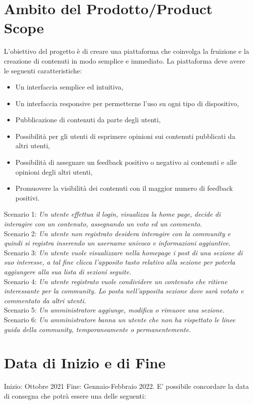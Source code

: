 \documentclass[12pt]{article}
\begin{document}
  \section{Ambito del Prodotto/Product Scope}
  L'obiettivo del progetto è di creare una piattaforma che coinvolga la fruizione e la creazione di contenuti in modo semplice e immediato. La piattaforma deve avere le seguenti caratteristiche:
  \begin{itemize}
  \item Un interfaccia semplice ed intuitiva,
  \item Un interfaccia responsive per permetterne l’uso su ogni tipo di dispositivo,
  \item Pubblicazione di contenuti da parte degli utenti,
  \item Possibilità per gli utenti di esprimere opinioni sui contenuti pubblicati da altri utenti,
  \item Possibilità di assegnare un feedback positivo o negativo ai contenuti e alle opinioni degli altri utenti,
  \item Promuovere la visibilità dei contenuti con il maggior numero di feedback positivi.
  
  \end{itemize}
  Scenario 1:
  \emph{Un utente effettua il login, visualizza la home page, decide di interagire con un contenuto, assegnando un voto ed un commento.}
\\
  Scenario 2:
  \emph{Un utente non registrato desidera interagire con la community e quindi si registra inserendo un username univoco e informazioni aggiuntive.}
\\
  Scenario 3:
  \emph{Un utente vuole visualizzare nella homepage i post di una sezione di suo interesse, a tal fine clicca l'apposito tasto relativo alla sezione per poterla aggiungere alla sua lista di sezioni seguite.}
\\
  Scenario 4:
  \emph{Un utente registrato vuole condividere un contenuto che ritiene interessante per la community. Lo posta nell'apposita sezione dove sarà votato e commentato da altri utenti.}
\\
  Scenario 5:
  \emph{Un amministratore aggiunge, modifica o rimuove una sezione.}
\\
  Scenario 6:
  \emph{Un amministratore banna un utente che non ha rispettato le linee guida della community, temporaneamente o permanentemente.}

  
  \section{Data di Inizio e di Fine}
  Inizio: Ottobre 2021
  Fine: Gennaio-Febbraio 2022. E’ possibile concordare la data di consegna che potrà essere una delle seguenti:
  
\end{document}
